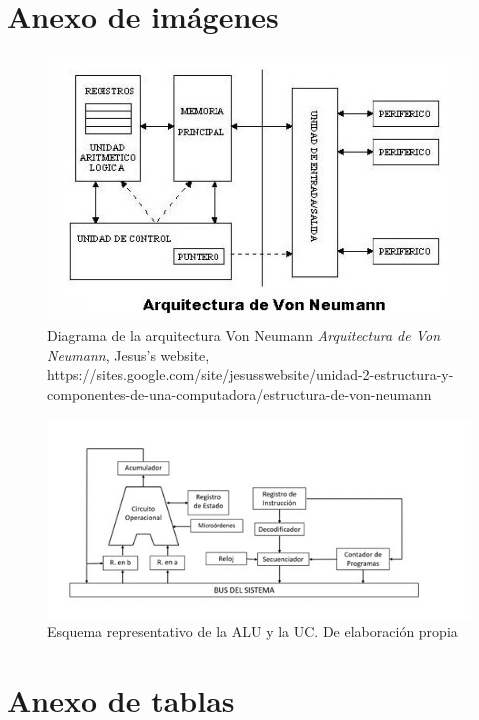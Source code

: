\documentclass{book}
\begin{document}
\chapter{Anexo de imágenes}

\begin{figure}[H]
    \centering
    \includegraphics[width=1\textwidth]{figures/Von_Neumann.png}
    \caption{ \Centering Diagrama  de la arquitectura Von Neumann\newline
        \textit{Arquitectura de Von Neumann}, Jesus's website, https://sites.google.com/site/jesusswebsite/unidad-2-estructura-y-componentes-de-una-computadora/estructura-de-von-neumann}
    \label{fig:arq_vn}
\end{figure}


\begin{figure}[H]
    \centering
    \includegraphics[width=1\textwidth]{figures/ALU .jpg}
    \caption{ Esquema representativo de la ALU y la UC.\newline
        De elaboración propia}
    \label{fig:alu}
\end{figure}


\chapter{Anexo de tablas}
\end{document}
